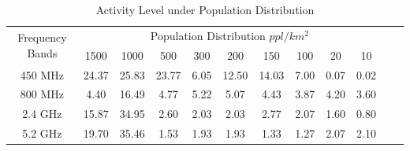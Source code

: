 \begin{table}
\centering %
\begin{tabular}{|c|c|c|c|c|c|c|c|c|c|c|c|} %
\hline %
 \multirow{2}{*}{Frequency Bands} & \multicolumn{9}{|c|}{Population Distribution $ppl/km^2$} \\
\cline{2-10}
		& 1500 & 1000 & 500 & 300 &  200 & 150 & 100 & 20 & 10 \\ %
\hline %
450 MHz &24.37	&25.83  &23.77	&6.05 &12.50  &14.03 & 7.00 & 0.07 & 0.02 \\      
\hline %
800 MHz &4.40 	&16.49  &4.77	&5.22&5.07 &4.43  & 3.87 & 4.20 & 3.60 \\      
\hline %
2.4 GHz &15.87 	&34.95  &2.60	&2.03&2.03 &2.77  & 2.07 & 1.60 & 0.80 \\      
\hline %
5.2 GHz &19.70	&35.46  &1.53	&1.93&1.93 &1.33  & 1.27 & 2.07 & 2.10 \\      
\hline %
\end{tabular}    
\caption{Activity Level under Population Distribution} %
\label{tab:activitymeasurement}    
\vspace{-0.3in}
\end{table}    

